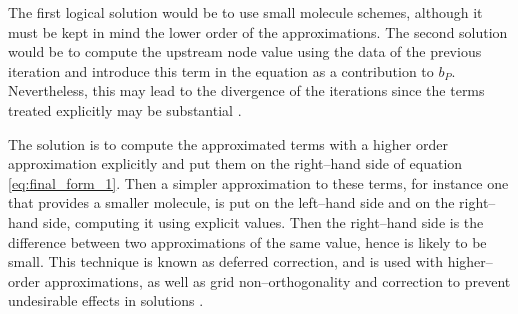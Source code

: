 The first logical solution would be to use small molecule schemes, although it must be kept in mind the lower order of the approximations. The second solution would be to compute the upstream node value using the data of the previous iteration and introduce this term in the equation as a contribution to $b_P$. Nevertheless, this may lead to the divergence of the iterations since the terms treated explicitly may be substantial \cite{ferziger2002computational5deferred}. 

The solution is to compute the approximated terms with a higher order approximation explicitly and put them on the right--hand side of equation \eqref{eq:final_form_1}. Then a simpler approximation to these terms, for instance one that provides a smaller molecule, is put on the left--hand side and on the right--hand side, computing it using explicit values. Then the right--hand side is the difference between two approximations of the same value, hence is likely to be small. This technique is known as deferred correction, and is used with higher--order approximations, as well as grid non--orthogonality and correction to prevent undesirable effects in solutions \cite{ferziger2002computational5deferred}.

